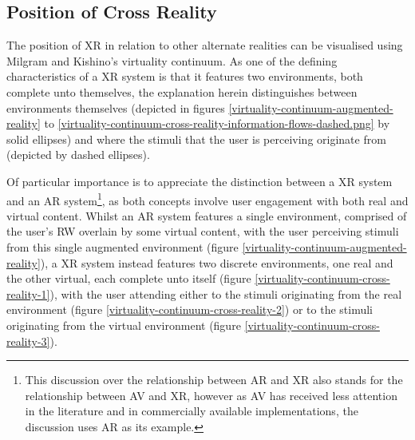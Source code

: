 

\subsection{Position of Cross Reality}

\label{positionofcrossreality}

\newcommand{\avxrfootnote}{\footnote{This discussion over the relationship between AR and XR also stands for the relationship between AV and XR, however as AV has received less attention in the literature and in commercially available implementations, the discussion uses AR as its example.}}

The position of XR in relation to other alternate realities can be visualised using Milgram and Kishino's virtuality continuum. As one of the defining characteristics of a XR system is that it features two environments, both complete unto themselves, the explanation herein distinguishes between environments themselves (depicted in figures \ref{virtuality-continuum-augmented-reality} to \ref{virtuality-continuum-cross-reality-information-flows-dashed.png} by solid ellipses) and where the stimuli that the user is perceiving originate from (depicted by dashed ellipses).


Of particular importance is to appreciate the distinction between a XR system and an AR system\avxrfootnote{}, as both concepts involve user engagement with both real and virtual content. Whilst an AR system features a single environment, comprised of the user's RW overlain by some virtual content, with the user perceiving stimuli from this single augmented environment (figure \ref{virtuality-continuum-augmented-reality}), a XR system instead features two discrete environments, one real and the other virtual, each complete unto itself (figure \ref{virtuality-continuum-cross-reality-1}), with the user attending either to the stimuli originating from the real environment (figure \ref{virtuality-continuum-cross-reality-2}) or to the stimuli originating from the virtual environment (figure \ref{virtuality-continuum-cross-reality-3}).

